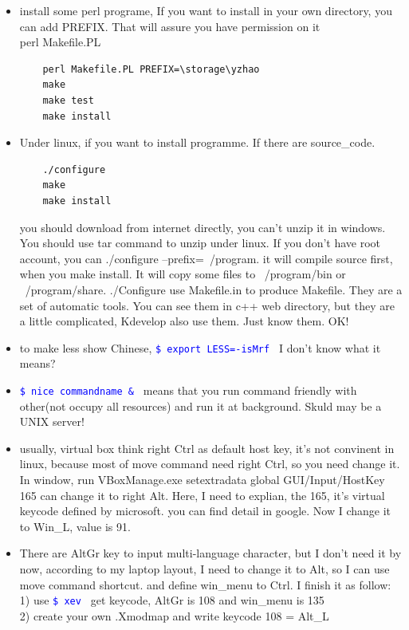 \documentclass[a4paper,12pt,twoside]{book}
\newcommand{\linuxcommand}[1]{\texttt{\textcolor{blue}{\$ #1 \Pisymbol{psy}{191}}}}
\begin{document}
\begin{CJK*}{UTF8}{song}
\begin{itemize}
	\item install some perl programe, If you want to install in your own directory, you can add PREFIX. That will assure you have permission on it \\
  	 perl Makefile.PL  
    \begin{verbatim}
    perl Makefile.PL PREFIX=\storage\yzhao
    make
    make test
    make install
    \end{verbatim}
	\item Under linux, if you want to install programme. If there are source\_code. \\
    \begin{verbatim}
	./configure 
	make
	make install
    \end{verbatim}
	you should download from internet directly, you can't unzip it in windows. You should use tar command to unzip under linux. If you don't have root account, you can ./configure --prefix=~/program. it will compile source first, when you make install. It will copy some files to ~/program/bin or ~/program/share.
	./Configure use Makefile.in to produce Makefile. They are a set of automatic tools. You can see them in c++ web directory, but they are a little complicated, Kdevelop also use them. Just know them. OK!
	\item to make less show Chinese, \linuxcommand{export LESS=-isMrf} I don't know what it means?
	\item \linuxcommand{nice commandname \&} means that you run command friendly with other(not occupy all resources) and run it at background. Skuld may be a UNIX server!
	\item usually, virtual box think right Ctrl as default host key, it's not convinent in linux, because most of move command need right Ctrl, so you need change it.
	In window, run VBoxManage.exe setextradata global GUI/Input/HostKey 165 can change it to right Alt. Here, I need to explian, the 165, it's virtual keycode defined by
	microsoft. you can find detail in google. Now I change it to Win\_L, value is 91.
	\item There are AltGr key to input multi-language character, but I don't need it by now, according to my laptop layout, I need to change it to Alt, so I
	can use move command shortcut. and define win\_menu to Ctrl. I finish it as follow: \\
	1) use \linuxcommand{xev} get keycode, AltGr is 108 and win\_menu is 135 \\
	2) create your own .Xmodmap and write keycode 108 = Alt\_L\\

\end{itemize}
\end{CJK*}
\end{document}

